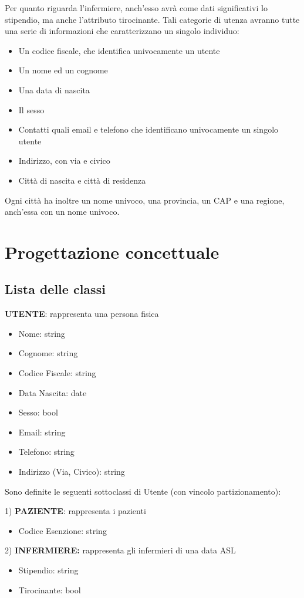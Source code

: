 \documentclass{report}
\begin{document}
Per quanto riguarda l'infermiere, anch'esso avrà come dati significativi lo stipendio, ma anche l'attributo tirocinante. Tali categorie di utenza avranno tutte una serie di informazioni che caratterizzano un singolo individuo:
\begin{itemize}
\item Un codice fiscale, che identifica univocamente un utente
\item Un nome ed un cognome
\item Una data di nascita
\item Il sesso
\item Contatti quali email e telefono che identificano univocamente un singolo utente
\item Indirizzo, con via e civico
\item Città di nascita e città di residenza
\end{itemize}
Ogni città ha inoltre un nome univoco, una provincia, un CAP e una regione, anch'essa con un nome univoco. 

\section*{Progettazione concettuale}
\subsection*{Lista delle classi}

\textbf{UTENTE}: rappresenta una persona fisica
\begin{itemize}
\item Nome: string
\item Cognome: string
\item Codice Fiscale: string
\item Data Nascita: date
\item Sesso: bool
\item Email: string
\item Telefono: string
\item Indirizzo (Via, Civico): string
\end{itemize}

Sono definite le seguenti sottoclassi di Utente (con vincolo partizionamento):

1) \textbf{PAZIENTE}: rappresenta i pazienti 
\begin{itemize}
\item Codice Esenzione: string
\end{itemize}

2) \textbf{INFERMIERE:} 
rappresenta gli infermieri di una data ASL
\begin{itemize}
\item Stipendio: string
\item Tirocinante: bool
\end{itemize}
\end{document}
